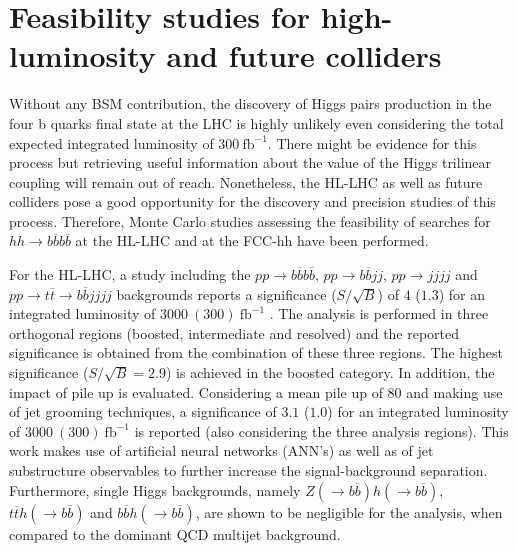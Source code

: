 \section{Feasibility studies for high-luminosity and future colliders}
\label{section:feasibility}


Without any BSM contribution, the discovery of Higgs pairs production in the four b quarks final state at the LHC is highly unlikely even considering the total expected integrated luminosity of $300~\text{fb}^{-1}$. There might be evidence for this process but retrieving useful information about the value of the Higgs trilinear coupling will remain out of reach. Nonetheless, the HL-LHC as well as future colliders pose a good opportunity for the discovery and precision studies of this process. Therefore, Monte Carlo studies assessing the feasibility of searches for $hh\rightarrow b\overline{b}b\overline{b}$ at the HL-LHC and at the FCC-hh have been performed.

For the HL-LHC, a study including the $pp\rightarrow b\overline{b}b\overline{b}$, $pp\rightarrow b\overline{b}jj$, $pp\rightarrow jjjj$ and $pp\rightarrow t\overline{t}\rightarrow b\overline{b}jjjj$ backgrounds reports a significance ($S/\sqrt{B}$) of $4$ ($1.3$) for an integrated luminosity of $3000~(300)~\text{fb}^{-1}$ \cite{hhFeasibility}. The analysis is performed in three orthogonal regions (boosted, intermediate and resolved) and the reported significance is obtained from the combination of these three regions. The highest significance ($S/\sqrt{B}=2.9$) is achieved in the boosted category. In addition, the impact of pile up is evaluated. Considering a mean pile up of $80$ and making use of jet grooming techniques, a significance of $3.1$ ($1.0$) for an integrated luminosity of $3000~(300)~\text{fb}^{-1}$ is reported (also considering the three analysis regions). This work makes use of artificial neural networks (ANN's) as well as of jet substructure observables to further increase the signal-background separation. Furthermore, single Higgs backgrounds, namely $Z(\rightarrow b\overline{b})h(\rightarrow b\overline{b})$, $t\overline{t}h(\rightarrow b\overline{b})$ and $b\overline{b}h(\rightarrow b\overline{b})$, are shown to be negligible for the analysis, when compared to the dominant QCD multijet background.

